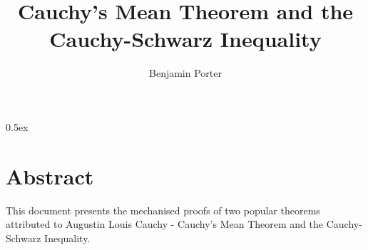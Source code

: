 \documentclass[11pt,a4paper,oneside]{book}
\begin{document}
\title{Cauchy's Mean Theorem and the Cauchy-Schwarz Inequality}
\author{Benjamin Porter}
\maketitle

\tableofcontents

\parindent 0pt\parskip 0.5ex

\chapter*{Abstract}

This document presents the mechanised proofs of two popular theorems
attributed to Augustin Louis Cauchy - Cauchy's Mean Theorem and the
Cauchy-Schwarz Inequality.




%
%
\end{document}
